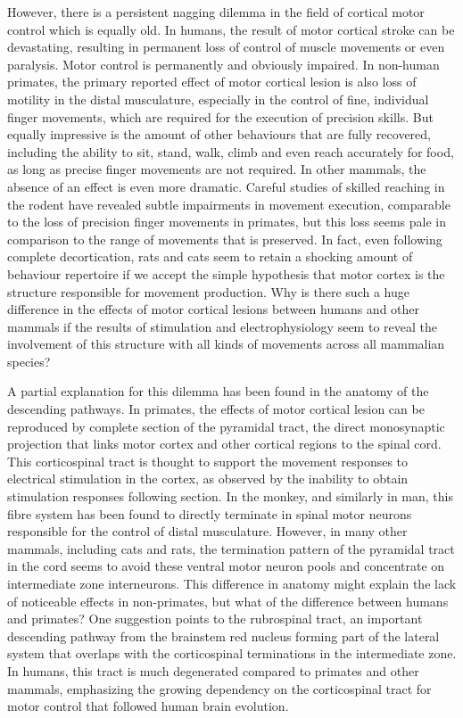 However, there is a persistent nagging dilemma in the field of cortical motor control which is equally old. In humans, the result of motor cortical stroke can be devastating, resulting in permanent loss of control of muscle movements or even paralysis. Motor control is permanently and obviously impaired. In non-human primates, the primary reported effect of motor cortical lesion is also loss of motility in the distal musculature, especially in the control of fine, individual finger movements, which are required for the execution of precision skills. But equally impressive is the amount of other behaviours that are fully recovered, including the ability to sit, stand, walk, climb and even reach accurately for food, as long as precise finger movements are not required. In other mammals, the absence of an effect is even more dramatic. Careful studies of skilled reaching in the rodent have revealed subtle impairments in movement execution, comparable to the loss of precision finger movements in primates, but this loss seems pale in comparison to the range of movements that is preserved. In fact, even following complete decortication, rats and cats seem to retain a shocking amount of behaviour repertoire if we accept the simple hypothesis that motor cortex is the structure responsible for movement production. Why is there such a huge difference in the effects of motor cortical lesions between humans and other mammals if the results of stimulation and electrophysiology seem to reveal the involvement of this structure with all kinds of movements across all mammalian species?

A partial explanation for this dilemma has been found in the anatomy of the descending pathways. In primates, the effects of motor cortical lesion can be reproduced by complete section of the pyramidal tract, the direct monosynaptic projection that links motor cortex and other cortical regions to the spinal cord. This corticospinal tract is thought to support the movement responses to electrical stimulation in the cortex, as observed by the inability to obtain stimulation responses following section. In the monkey, and similarly in man, this fibre system has been found to directly terminate in spinal motor neurons responsible for the control of distal musculature. However, in many other mammals, including cats and rats, the termination pattern of the pyramidal tract in the cord seems to avoid these ventral motor neuron pools and concentrate on intermediate zone interneurons. This difference in anatomy might explain the lack of noticeable effects in non-primates, but what of the difference between humans and primates? One suggestion points to the rubrospinal tract, an important descending pathway from the brainstem red nucleus forming part of the lateral system that overlaps with the corticospinal terminations in the intermediate zone. In humans, this tract is much degenerated compared to primates and other mammals, emphasizing the growing dependency on the corticospinal tract for motor control that followed human brain evolution.

